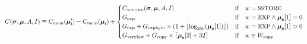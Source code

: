 \documentclass[9pt,oneside]{amsart}
\begin{document}
\nopagebreak
\begin{equation}
C(\boldsymbol{\sigma}, \boldsymbol{\mu}, A, I) \equiv C_{\mathrm{mem}}(\boldsymbol{\mu}'_{\mathrm{i}})-C_{\mathrm{mem}}(\boldsymbol{\mu}_{\mathrm{i}}) + \begin{cases}
C_\text{\tiny SSTORE}(\boldsymbol{\sigma}, \boldsymbol{\mu}, A, I) & \text{if} \quad w = \text{\small SSTORE} \\
G_{\mathrm{exp}} & \text{if} \quad w = \text{\small EXP} \wedge \boldsymbol{\mu}_{\mathbf{s}}[1] = 0 \\
G_{\mathrm{exp}} + G_{\mathrm{expbyte}}\times(1+\lfloor\log_{256}(\boldsymbol{\mu}_{\mathbf{s}}[1])\rfloor) & \text{if} \quad w = \text{\small EXP} \wedge \boldsymbol{\mu}_{\mathbf{s}}[1] > 0 \\
G_{\mathrm{verylow}} + G_{\mathrm{copy}}\times\lceil\boldsymbol{\mu}_{\mathbf{s}}[2] \div 32\rceil & \text{if} \quad w \in W_{\mathrm{copy}} \\


\end{cases}
\end{equation}
\end{document}
